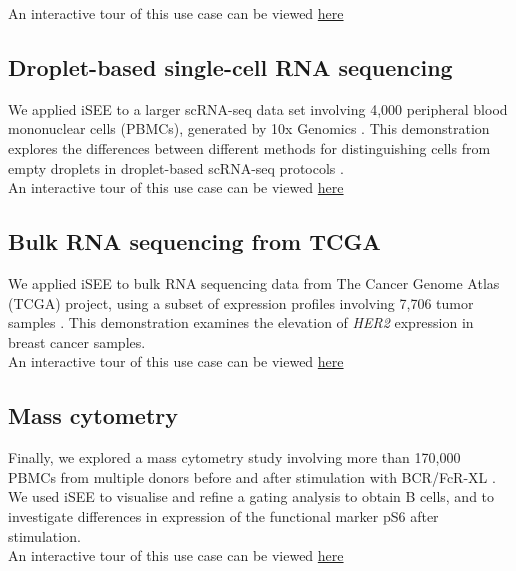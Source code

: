 \documentclass[10pt,a4paper,twocolumn]{article}
\begin{document}
An interactive tour of this use case can be viewed \href{http://shiny.imbei.uni-mainz.de:3838/iSEE/}{here}

\subsection*{Droplet-based single-cell RNA sequencing}
We applied iSEE to a larger scRNA-seq data set involving 4,000 peripheral blood mononuclear cells (PBMCs), generated by 10x Genomics \citep{zheng2017massively}.
This demonstration explores the differences between different methods for distinguishing cells from empty droplets in droplet-based scRNA-seq protocols \citep{lun2018distinguishing}.\\

An interactive tour of this use case can be viewed \href{http://shiny.imbei.uni-mainz.de:3838/iSEE_PBMC4k/}{here}

\subsection*{Bulk RNA sequencing from TCGA}
We applied iSEE to bulk RNA sequencing data from The Cancer Genome Atlas (TCGA) project, using a subset of expression profiles involving 7,706 tumor samples \citep{piccolo2015TCGA}.
This demonstration examines the elevation of \textit{HER2} expression in breast cancer samples.\\

An interactive tour of this use case can be viewed \href{http://shiny.imbei.uni-mainz.de:3838/iSEE_TCGA/}{here}

\subsection*{Mass cytometry}
Finally, we explored a mass cytometry study involving more than 170,000 PBMCs from multiple donors before and after stimulation with BCR/FcR-XL \citep{bodenmiller2012cytof}.
We used iSEE to visualise and refine a gating analysis to obtain B cells, and to investigate differences in expression of the functional marker pS6 after stimulation.\\

An interactive tour of this use case can be viewed \href{http://shiny.imbei.uni-mainz.de:3838/iSEE_cytof/}{here}
\end{document}
